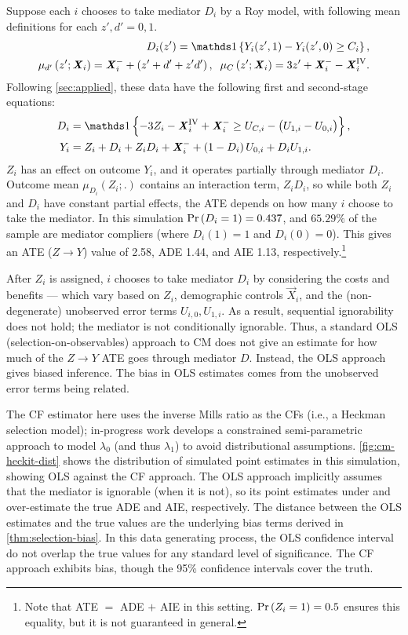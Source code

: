 Suppose each $i$ chooses to take mediator $D_i$ by a Roy model, with following mean definitions for each $z', d' = 0, 1$.
\begin{align*}
    D_i(z') = \indicator{Y_i(z', 1) - Y_i(z', 0) \geq C_i},  \\
    \mu_{d'}\left(z' ; \vec X_i \right) = \vec X_i^- + \left( z' + d' + z' d' \right),
    \;\; \mu_{C}\left(z' ; \vec X_i \right) = 3z' + \vec X_i^- - \vec X_i^{\text{IV}}.
\end{align*}
Following \autoref{sec:applied}, these data have the following first and second-stage equations:
\begin{align*}
    D_i &= \indicator{-3Z_i - \vec X_i^{\text{IV}} + \vec X_i^-
        \geq U_{C,i} - \big( U_{1,i} - U_{0,i} \big)},  \\
    Y_i &= Z_i + D_i + Z_i D_i + \vec X_i^-
        + \left( 1 - D_i \right) U_{0,i} + D_i U_{1,i}.
\end{align*}
$Z_i$ has an effect on outcome $Y_i$, and it operates partially through mediator $D_i$.
Outcome mean $\mu_{D_i}(Z_i;.)$ contains an interaction term, $Z_i D_i$, so while both $Z_i$ and $D_i$ have constant partial effects, the ATE depends on how many $i$ choose to take the mediator.
In this simulation $\Pr\left( D_i = 1 \right) = 0.437$, and $65.29\%$ of the sample are mediator compliers (where $D_i(1)=1$ and $D_i(0) = 0$).
This gives an ATE ($Z\to Y$) value of 2.58, ADE 1.44, and AIE 1.13, respectively.\footnote{
    Note that ATE $=$ ADE $+$ AIE in this setting.
    $\Pr\left( Z_i=1 \right) = 0.5$ ensures this equality, but it is not guaranteed in general.
}

After $Z_i$ is assigned, $i$ chooses to take mediator $D_i$ by considering the costs and benefits --- which vary based on $Z_i$, demographic controls $\vec X_i$, and the (non-degenerate) unobserved error terms $U_{i,0}, U_{1,i}$.
As a result, sequential ignorability does not hold; the mediator is not conditionally ignorable.
Thus, a standard OLS (selection-on-observables) approach to CM does not give an estimate for how much of the $Z \to Y$ ATE goes through mediator $D$.
Instead, the OLS approach gives biased inference.
The bias in OLS estimates comes from the unobserved error terms being related.

The CF estimator here uses the inverse Mills ratio as the CFs (i.e., a Heckman selection model); in-progress work develops a constrained semi-parametric approach to model $\lambda_0$ (and thus $\lambda_1$) to avoid distributional assumptions.
\autoref{fig:cm-heckit-dist} shows the distribution of simulated point estimates in this simulation, showing OLS against the CF approach.
The OLS approach implicitly assumes that the mediator is ignorable (when it is not), so its point estimates under and over-estimate the true ADE and AIE, respectively.
The distance between the OLS estimates and the true values are the underlying bias terms derived in \autoref{thm:selection-bias}.
In this data generating process, the OLS confidence interval do not overlap the true values for any standard level of significance.
The CF approach exhibits bias, though the 95\% confidence intervals cover the truth.


